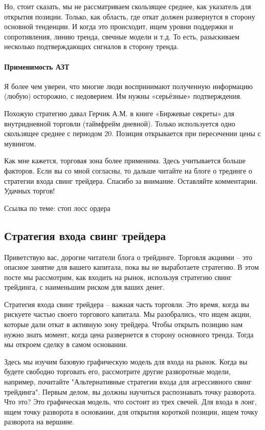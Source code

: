 \documentclass{book}
\begin{document}
Но, стоит сказать, мы не рассматриваем скользящее среднее, как
указатель для открытия позиции. Только, как область, где откат должен
развернутся в сторону основной тенденции. И когда это происходит, ищем
уровни поддержки и сопротивления, линию тренда, свечные модели и
т.д. То есть, разыскиваем несколько подтверждающих сигналов в сторону
тренда.

\paragraph{Применимость АЗТ}

Я более чем уверен, что многие люди воспринимают полученную информацию (любую) осторожно, с недоверием. Им нужны «серьёзные» подтверждения.

Похожую стратегию давал Герчик А.М. в книге «Биржевые секреты» для внутридневной торговли (таймфрейм дневной). Только используется одно скользящее среднее с периодом 20. Позиция открывается при пересечении цены с мувингом.

Как мне кажется, торговая зона более применима. Здесь учитывается больше факторов. Если вы со мной согласны, то дальше читайте на блоге о трединге о стратегии входа свинг трейдера. Спасибо за внимание. Оставляйте комментарии. Удачных торгов!


Ссылка по теме: стоп лосс ордера

\subsection{Стратегия входа свинг трейдера}

Приветствую вас, дорогие читатели блога о трейдинге. Торговля акциями – это опасное занятие для вашего капитала, пока вы не выработаете стратегию. В этом посте мы рассмотрим, как входить на рынок, используя стратегию свинг трейдинга, с наименьшим риском для ваших денег.

Стратегия входа свинг трейдера – важная часть торговли. Это время, когда вы рискуете частью своего торгового капитала. Мы разобрались, что ищем акции, которые дали откат в активную зону трейдера. Чтобы открыть позицию нам нужно знать момент, когда цена развернется в сторону основного тренда. Тогда мы откроем сделку в самом основании.

Здесь мы изучим базовую графическую модель для входа на рынок. Когда
вы будете свободно торговать его, рассмотрите другие разворотные
модели, например, почитайте "Альтернативные стратегии входа для
агрессивного свинг трейдинга". Первым делом, вы должны научиться
распознавать точку разворота. Что это? Это графическая модель, что
состоит из трех свечей. Для входа в лонг, ищем точку разворота в
основании, для открытия короткой позиции, ищем точку разворота на
вершине.
\end{document}
